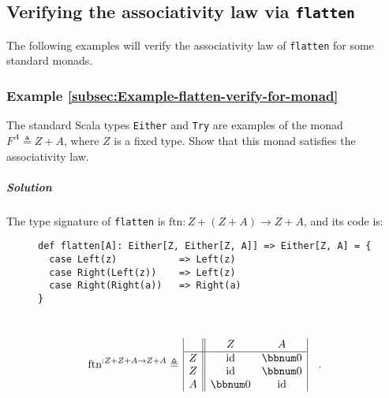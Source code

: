 \subsection{Verifying the associativity law via \texttt{flatten}}

\begin{comment}
The associativity law of \lstinline!flatMap! was demonstrated to
hold for the \lstinline!Option! monad in Chapter~\ref{chap:Filterable-functors}
(see Eq.~(\ref{eq:associativity-law-of-flatMap-for-Option}) in the
proof of Statement~\ref{subsec:Statement-filterable-coproduct-1}). 
\end{comment}
The following examples will verify the associativity law of \lstinline!flatten!
for some standard monads.

\subsubsection{Example \label{subsec:Example-flatten-verify-for-monad}\ref{subsec:Example-flatten-verify-for-monad}}

The standard Scala types \lstinline!Either! and \lstinline!Try!
are examples of the monad $F^{A}\triangleq Z+A$, where $Z$ is a
fixed type. Show that this monad satisfies the associativity law.

\subparagraph{Solution}

The type signature of \lstinline!flatten! is $\text{ftn}:Z+\left(Z+A\right)\rightarrow Z+A$,
and its code is:

\begin{wrapfigure}{l}{0.6\columnwidth}%
\vspace{-0.2\baselineskip}
\begin{lstlisting}
def flatten[A]: Either[Z, Either[Z, A]] => Either[Z, A] = {
  case Left(z)           => Left(z)
  case Right(Left(z))    => Left(z)
  case Right(Right(a))   => Right(a)
}
\end{lstlisting}

\vspace{-3.2\baselineskip}
\end{wrapfigure}%

~\vspace{-1.2\baselineskip}
\[
\text{ftn}^{:Z+Z+A\rightarrow Z+A}\triangleq\,\begin{array}{|c||cc|}
 & Z & A\\
\hline Z & \text{id} & \bbnum 0\\
Z & \text{id} & \bbnum 0\\
A & \bbnum 0 & \text{id}
\end{array}\quad.
\]
\vspace{-0.8\baselineskip}

